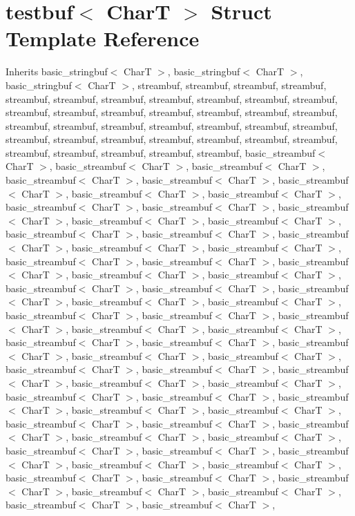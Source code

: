 \hypertarget{structtestbuf}{}\section{testbuf$<$ CharT $>$ Struct Template Reference}
\label{structtestbuf}


Inherits basic\+\_\+stringbuf$<$ Char\+T $>$, basic\+\_\+stringbuf$<$ Char\+T $>$, basic\+\_\+stringbuf$<$ Char\+T $>$, streambuf, streambuf, streambuf, streambuf, streambuf, streambuf, streambuf, streambuf, streambuf, streambuf, streambuf, streambuf, streambuf, streambuf, streambuf, streambuf, streambuf, streambuf, streambuf, streambuf, streambuf, streambuf, streambuf, streambuf, streambuf, streambuf, streambuf, streambuf, streambuf, streambuf, streambuf, streambuf, streambuf, streambuf, streambuf, streambuf, streambuf, basic\+\_\+streambuf$<$ Char\+T $>$, basic\+\_\+streambuf$<$ Char\+T $>$, basic\+\_\+streambuf$<$ Char\+T $>$, basic\+\_\+streambuf$<$ Char\+T $>$, basic\+\_\+streambuf$<$ Char\+T $>$, basic\+\_\+streambuf$<$ Char\+T $>$, basic\+\_\+streambuf$<$ Char\+T $>$, basic\+\_\+streambuf$<$ Char\+T $>$, basic\+\_\+streambuf$<$ Char\+T $>$, basic\+\_\+streambuf$<$ Char\+T $>$, basic\+\_\+streambuf$<$ Char\+T $>$, basic\+\_\+streambuf$<$ Char\+T $>$, basic\+\_\+streambuf$<$ Char\+T $>$, basic\+\_\+streambuf$<$ Char\+T $>$, basic\+\_\+streambuf$<$ Char\+T $>$, basic\+\_\+streambuf$<$ Char\+T $>$, basic\+\_\+streambuf$<$ Char\+T $>$, basic\+\_\+streambuf$<$ Char\+T $>$, basic\+\_\+streambuf$<$ Char\+T $>$, basic\+\_\+streambuf$<$ Char\+T $>$, basic\+\_\+streambuf$<$ Char\+T $>$, basic\+\_\+streambuf$<$ Char\+T $>$, basic\+\_\+streambuf$<$ Char\+T $>$, basic\+\_\+streambuf$<$ Char\+T $>$, basic\+\_\+streambuf$<$ Char\+T $>$, basic\+\_\+streambuf$<$ Char\+T $>$, basic\+\_\+streambuf$<$ Char\+T $>$, basic\+\_\+streambuf$<$ Char\+T $>$, basic\+\_\+streambuf$<$ Char\+T $>$, basic\+\_\+streambuf$<$ Char\+T $>$, basic\+\_\+streambuf$<$ Char\+T $>$, basic\+\_\+streambuf$<$ Char\+T $>$, basic\+\_\+streambuf$<$ Char\+T $>$, basic\+\_\+streambuf$<$ Char\+T $>$, basic\+\_\+streambuf$<$ Char\+T $>$, basic\+\_\+streambuf$<$ Char\+T $>$, basic\+\_\+streambuf$<$ Char\+T $>$, basic\+\_\+streambuf$<$ Char\+T $>$, basic\+\_\+streambuf$<$ Char\+T $>$, basic\+\_\+streambuf$<$ Char\+T $>$, basic\+\_\+streambuf$<$ Char\+T $>$, basic\+\_\+streambuf$<$ Char\+T $>$, basic\+\_\+streambuf$<$ Char\+T $>$, basic\+\_\+streambuf$<$ Char\+T $>$, basic\+\_\+streambuf$<$ Char\+T $>$, basic\+\_\+streambuf$<$ Char\+T $>$, basic\+\_\+streambuf$<$ Char\+T $>$, basic\+\_\+streambuf$<$ Char\+T $>$, basic\+\_\+streambuf$<$ Char\+T $>$, basic\+\_\+streambuf$<$ Char\+T $>$, basic\+\_\+streambuf$<$ Char\+T $>$, basic\+\_\+streambuf$<$ Char\+T $>$, basic\+\_\+streambuf$<$ Char\+T $>$, basic\+\_\+streambuf$<$ Char\+T $>$, basic\+\_\+streambuf$<$ Char\+T $>$, basic\+\_\+streambuf$<$ Char\+T $>$, basic\+\_\+streambuf$<$ Char\+T $>$, basic\+\_\+streambuf$<$ Char\+T $>$, basic\+\_\+streambuf$<$ Char\+T $>$, basic\+\_\+streambuf$<$ Char\+T $>$, basic\+\_\+streambuf$<$ Char\+T $>$, basic\+\_\+streambuf$<$ Char\+T $>$, basic\+\_\+streambuf$<$ Char\+T $>$, basic\+\_\+streambuf$<$ Char\+T $>$, basic\+\_\+streambuf$<$ Char\+T $>$, 